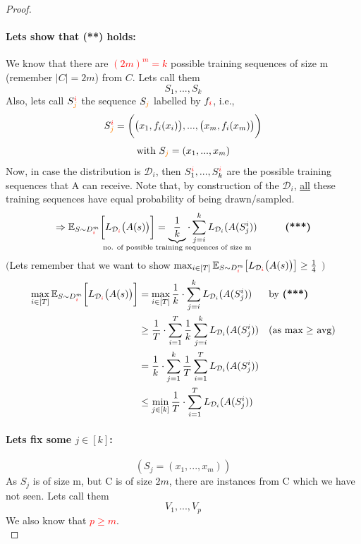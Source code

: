 \documentclass[10pt,a4paper]{article}
\theoremstyle{remark}
\theoremstyle{definition}
\theoremstyle{plain}
\begin{document}
\begin{proof}
	\paragraph{Lets show that (**) holds:} We know that there are \textcolor{red}{$(2m)^m = k$} possible training sequences of size m (remember $|C| = 2m$) from $C$. Lets call them
	$$ S_1, ..., S_k $$
	Also, lets call $S_{\textcolor{orange}{j}}^{\textcolor{red}{i}}$ the sequence $S_{\textcolor{orange}{j}}$ labelled by $f_{\textcolor{red}{i}}$, i.e.,
	$$
	 S_{\textcolor{orange}{j}}^{\textcolor{red}{i}} = \bigg( \big(x_1, f_i(x_i)\big), ..., \big(x_m, f_i(x_m)\big)\bigg)
	$$ 
	$$
		\text{with } S_{\textcolor{orange}{j}} = (x_1, ..., x_m)
	$$
	Now, in case the distribution is $\mathcal{D}_i$, then $S_1^{\textcolor{red}{i}}, ..., S_k^{\textcolor{red}{i}}$ are the possible training sequences that A can receive. Note that, by construction of the $\mathcal{D}_i$, \underline{all} these training sequences have equal probability of being drawn/sampled.
	$$
		\Rightarrow\mathbb{E}_{S \sim D^{m}_{\textcolor{red}{i}}}\bigg[L_{\mathcal{D}_{\textcolor{red}{i}}}\big(A(s)\big)\bigg] = \underbrace{\frac{1}{k}}_{\mathclap{  \text{no. of possible training sequences of size m}}} \cdot \sum_{j = i}^{k} L_{\mathcal{D}_i}(A(S_{j}^{i})) \hspace{1cm} \text{\textbf{(***)}}
	$$ 
	$\Big($Lets remember that we want to show
	$
		\max_{i \in [T]} \mathbb{E}_{S \sim D^{m}_{\textcolor{red}{i}}}\big[L_{\mathcal{D}_{\textcolor{red}{i}}}\big(A(s)\big)\big] \geq \frac{1}{4}
	$ $\Big)$
	\begin{align*}
		\max_{i \in [T]} \mathbb{E}_{S \sim D^{m}_{\textcolor{red}{i}}}\bigg[L_{\mathcal{D}_{\textcolor{red}{i}}}\big(A(s)\big)\bigg] 
			&= \max_{i \in [T]} \frac{1}{k} \cdot \sum_{j = i}^{k} L_{\mathcal{D}_i}(A(S_{j}^{i})) 
				&& \text{by \textbf{(***)}} \\
			&\geq \frac{1}{T} \cdot \sum_{i=1}^{T} \frac{1}{k} \sum_{j = i}^{k} L_{\mathcal{D}_i}(A(S_j^i))
				&& \text{(as $\max \geq$ avg)} \\
			&= \frac{1}{k} \cdot \sum_{j=1}^{k} \frac{1}{T} \sum_{i = 1}^{T} L_{\mathcal{D}_i}(A(S_j^i))\\
			&\leq \min_{j \in [k]} \frac{1}{T} \cdot \sum_{i = 1}^{T} L_{\mathcal{D}_i}(A(S_j^i))
	\end{align*}
	
	\paragraph{Lets fix some $j \in [k]$:}
	$$(S_j = (x_1, ..., x_m))$$
	As $S_j$ is of size m, but C is of size $2m$, there are instances from C which we have not seen. Lets call them 
	$$ V_1, ..., V_p$$
	We also know that \textcolor{red}{$p \geq m$}.\\
	

\end{proof}
\end{document}

